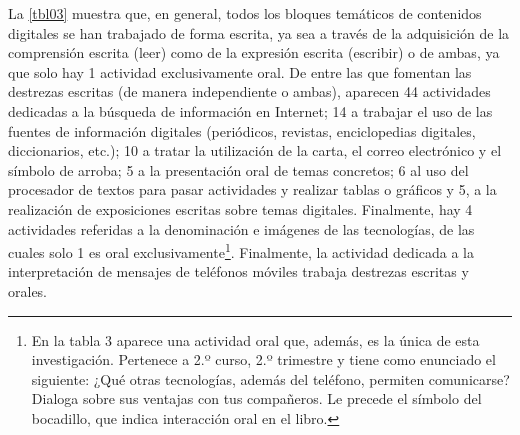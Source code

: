 \documentclass{textolivre}
\begin{document}
La \cref{tbl03} muestra que, en general, todos los bloques temáticos de contenidos digitales se han trabajado de forma escrita, ya sea a través de la adquisición de la comprensión escrita (leer) como de la expresión escrita (escribir) o de ambas, ya que solo hay 1 actividad exclusivamente oral. De entre las que fomentan las destrezas escritas (de manera independiente o ambas), aparecen 44 actividades dedicadas a la búsqueda de información en Internet; 14 a trabajar el uso de las fuentes de información digitales (periódicos, revistas, enciclopedias digitales, diccionarios, etc.); 10 a tratar la utilización de la carta, el correo electrónico y el símbolo de arroba; 5 a la presentación oral de temas concretos; 6 al uso del procesador de textos para pasar actividades y realizar tablas o gráficos y 5, a la realización de exposiciones escritas sobre temas digitales. Finalmente, hay 4 actividades referidas a la denominación e imágenes de las tecnologías, de las cuales solo 1 es oral exclusivamente\footnote{En la tabla 3 aparece una actividad oral que, además, es la única de esta investigación. Pertenece a 2.º curso, 2.º trimestre y tiene como enunciado el siguiente: ¿Qué otras tecnologías, además del teléfono, permiten comunicarse? Dialoga sobre sus ventajas con tus compañeros. Le precede el símbolo del bocadillo, que indica interacción oral en el libro.}. Finalmente, la actividad dedicada a la interpretación de mensajes de teléfonos móviles trabaja destrezas escritas y orales. 
\end{document}
